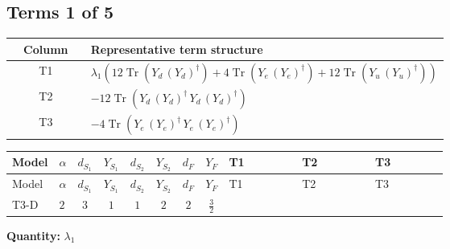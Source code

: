 \documentclass[8pt]{article}
\begin{document}
\begin{landscape}
\subsection*{Terms 1 of 5}
\begin{center}
\begin{tabular}{@{}c >{\raggedright\arraybackslash}p{0.82\linewidth}@{}}
\toprule
Column & Representative term structure \\
\midrule
T1 & \(\displaystyle {\lambda_1} (12 \operatorname{Tr}\!\left({Y_d}\,\left({Y_d}\right)^{\dagger}\right)+4 \operatorname{Tr}\!\left({Y_e}\,\left({Y_e}\right)^{\dagger}\right)+12 \operatorname{Tr}\!\left({Y_u}\,\left({Y_u}\right)^{\dagger}\right))\) \\
\midrule
T2 & \(\displaystyle -12 \operatorname{Tr}\!\left({Y_d}\,\left({Y_d}\right)^{\dagger}\,{Y_d}\,\left({Y_d}\right)^{\dagger}\right)\) \\
\midrule
T3 & \(\displaystyle -4 \operatorname{Tr}\!\left({Y_e}\,\left({Y_e}\right)^{\dagger}\,{Y_e}\,\left({Y_e}\right)^{\dagger}\right)\) \\
\midrule
\bottomrule
\end{tabular}
\end{center}
\smallskip
\tiny
\begin{longtable}{@{}llcccccc >{\raggedright\arraybackslash}p{0.21\linewidth} >{\raggedright\arraybackslash}p{0.21\linewidth} >{\raggedright\arraybackslash}p{0.21\linewidth}@{}}
\toprule
Model & $\alpha$ & $d_{S_1}$ & $Y_{S_1}$ & $d_{S_2}$ & $Y_{S_2}$ & $d_F$ & $Y_F$ & T1 & T2 & T3 \\
\midrule
\endfirsthead
\toprule
Model & $\alpha$ & $d_{S_1}$ & $Y_{S_1}$ & $d_{S_2}$ & $Y_{S_2}$ & $d_F$ & $Y_F$ & T1 & T2 & T3 \\
\midrule
\endhead
T3-D & $2$ & $3$ & $1$ & $1$ & $2$ & $2$ & $\frac{3}{2}$ & \scriptsize\adjustbox{max width=\linewidth}{$\begin{gathered} {\lambda_1} (12 \operatorname{Tr}\!\left({Y_d}\,\left({Y_d}\right)^{\dagger}\right)+4 \operatorname{Tr}\!\left({Y_e}\,\left({Y_e}\right)^{\dagger}\right)+12 \operatorname{Tr}\!\left({Y_u}\,\left({Y_u}\right)^{\dagger}\right))\end{gathered}$} & \scriptsize\adjustbox{max width=\linewidth}{$\begin{gathered} -12 \operatorname{Tr}\!\left({Y_d}\,\left({Y_d}\right)^{\dagger}\,{Y_d}\,\left({Y_d}\right)^{\dagger}\right)\end{gathered}$} & \scriptsize\adjustbox{max width=\linewidth}{$\begin{gathered} -4 \operatorname{Tr}\!\left({Y_e}\,\left({Y_e}\right)^{\dagger}\,{Y_e}\,\left({Y_e}\right)^{\dagger}\right)\end{gathered}$} \\
\midrule
\bottomrule
\end{longtable}
\clearpage
\noindent\textbf{Quantity: }$\lambda_1$\par\smallskip

\end{landscape}
\end{document}
